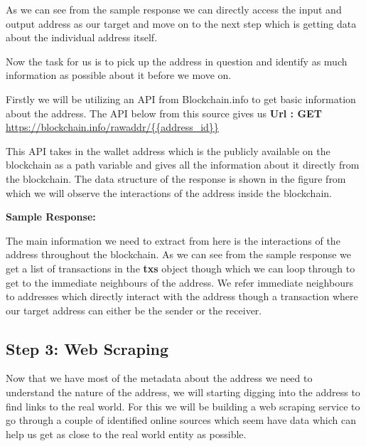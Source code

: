 \documentclass{article}
\begin{document}
        As we can see from the sample response we can directly access the input and output address as our target and move on to the next step which is getting data about the individual address itself.
        
        Now the task for us is to pick up the address in question and identify as much information as possible about it before we move on.
        
        Firstly we will be utilizing an API from Blockchain.info\cite{blockchain.com} to get basic information about the address. The API below from this source gives us
        \textbf{Url : GET} \url{https://blockchain.info/rawaddr/{{address_id}}}
        
        This API takes in the wallet address which is the publicly available on the blockchain as a path variable and gives all the information about it directly from the blockchain. The data structure of the response is shown in the figure\cite{} from which we will observe the interactions of the address inside the blockchain.
        
        \textbf{Sample Response: }
        
        
        
        The main information we need to extract from here is the interactions of the address throughout the blockchain. As we can see from the sample response we get a list of transactions in the \textbf{txs} object though which we can loop through to get to the immediate neighbours of the address. We refer immediate neighbours to addresses which directly interact with the address though a transaction where our target address can either be the sender or the receiver. 
        
    \subsection{Step 3: Web Scraping}
        Now that we have most of the metadata about the address we need to understand the nature of the address, we will starting digging into the address to find links to the real world. For this we will be building a web scraping service to go through a couple of identified online sources which seem have data which can help us get as close to the real world entity as possible. 
        
\end{document}
